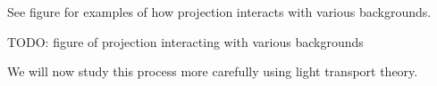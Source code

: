 See figure for examples of how projection interacts with various backgrounds.

{\color{red} TODO: figure of projection interacting with various backgrounds}

We will now study this process more carefully using light transport theory.








